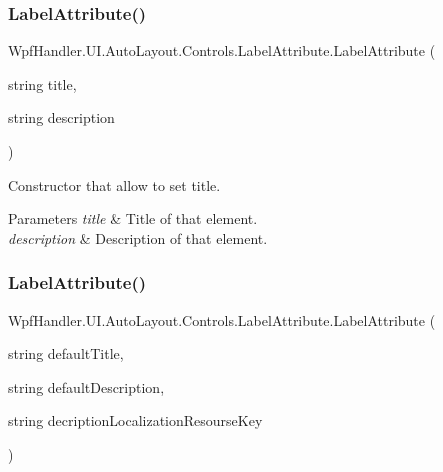 \subsubsection{\texorpdfstring{Label\+Attribute()}{LabelAttribute()}\hspace{0.1cm}{\footnotesize\ttfamily [2/4]}}
{\footnotesize\ttfamily Wpf\+Handler.\+U\+I.\+Auto\+Layout.\+Controls.\+Label\+Attribute.\+Label\+Attribute (\begin{DoxyParamCaption}\item[{string}]{title,  }\item[{string}]{description }\end{DoxyParamCaption})}



Constructor that allow to set title. 


\begin{DoxyParams}{Parameters}
{\em title} & Title of that element.\\
\hline
{\em description} & Description of that element.\\
\hline
\end{DoxyParams}
\mbox{\label{class_wpf_handler_1_1_u_i_1_1_auto_layout_1_1_controls_1_1_label_attribute_ae3fc540124479e4cdc343ab23ae1a1c9}} 
\subsubsection{\texorpdfstring{Label\+Attribute()}{LabelAttribute()}\hspace{0.1cm}{\footnotesize\ttfamily [3/4]}}
{\footnotesize\ttfamily Wpf\+Handler.\+U\+I.\+Auto\+Layout.\+Controls.\+Label\+Attribute.\+Label\+Attribute (\begin{DoxyParamCaption}\item[{string}]{default\+Title,  }\item[{string}]{default\+Description,  }\item[{string}]{decription\+Localization\+Resourse\+Key }\end{DoxyParamCaption})}



